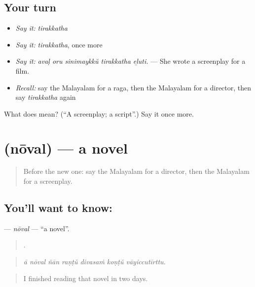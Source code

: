 \subsection*{Your turn}
\begin{itemize}
\raggedright
  \item \emph{Say it:} \emph{tirakkatha}
  \item \emph{Say it:} \emph{tirakkatha}, once more
  \item \emph{Say it:} \emph{avaḷ oru sinimaykkŭ tirakkatha eḻuti.} — She wrote a screenplay for a film.
  \item \emph{Recall:} say the Malayalam for a raga, then the Malayalam for a director, then say \emph{tirakkatha} again
\end{itemize}

\begin{tcolorbox}[breakable,colback=teal!4,colframe=teal!35!black,title={Before you move on}]
What does  mean? (\textquotedblleft{}A screenplay; a script\textquotedblright{}.) Say it once more.
\end{tcolorbox}
\section[\texorpdfstring{\ml{നോവൽ} (nōval)}{നോവൽ (nōval)}]{ (nōval) — a novel}

\label{lesson:ML-C562-noval}



\begin{quote}
Before the new one: say the Malayalam for a director, then the Malayalam for a screenplay.
\end{quote}

\subsection*{You'll want to know: }
\textbf{} — \emph{nōval} — \textquotedblleft{}a novel\textquotedblright{}.

\begin{quote}
      .
\end{quote}

\begin{quote}
\emph{ā nōval ñān raṇṭŭ divasaṁ koṇṭŭ vāyiccutīrttu.}
\end{quote}

\begin{quote}
I finished reading that novel in two days.
\end{quote}


